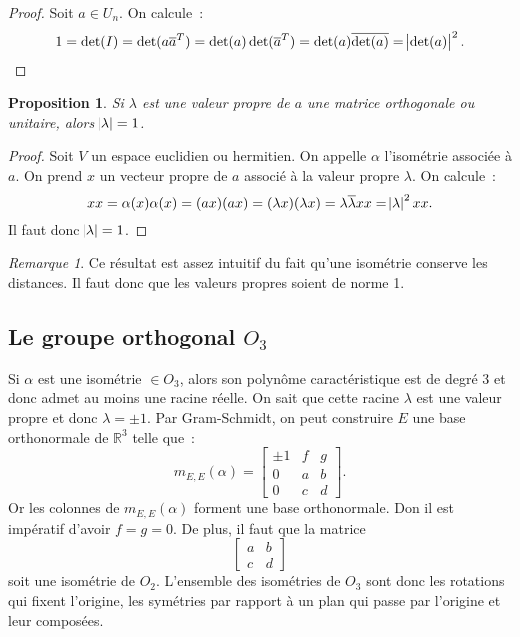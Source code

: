 \documentclass{article}
\newcommand{\R}{\mathbb R}
\newcommand{\conj}[1]{\overline {#1}}
\newtheorem{prp}[thm]{Proposition}
\theoremstyle{definition}
\theoremstyle{remark}
\newtheorem*{rmq}{Remarque}
\begin{document}
		\begin{proof} Soit $a \in U_n$. On calcule~:
		\[1 = \det(I) = \det(a\conj a^T) = \det(a)\det(\conj a^T) = \det(a)\conj{\det(a)} = \abs {\det(a)}^2.\]
		\end{proof}

		\begin{prp} Si $\lambda$ est une valeur propre de $a$ une matrice orthogonale ou unitaire, alors $\abs \lambda = 1$.
		\end{prp}

		\begin{proof} Soit $V$ un espace euclidien ou hermitien. On appelle $\alpha$ l'isométrie associée à $a$. On prend $x$ un vecteur propre de $a$ associé
		à la valeur propre $\lambda$. On calcule~:
		\[xx = \alpha(x)\alpha(x) = (ax)(ax) = (\lambda x)(\lambda x) = \lambda\conj{\lambda}xx = \abs \lambda^2xx.\]
		Il faut donc $\abs \lambda = 1$.
		\end{proof}

		\begin{rmq} Ce résultat est assez intuitif du fait qu'une isométrie conserve les distances. Il faut donc que les valeurs propres soient de norme 1.
		\end{rmq}

	\subsection{Le groupe orthogonal $O_3$}
		Si $\alpha$ est une isométrie $\in O_3$, alors son polynôme caractéristique est de degré 3 et donc admet au moins une racine réelle. On
		sait que cette racine $\lambda$ est une valeur propre et donc $\lambda = \pm 1$. Par Gram-Schmidt, on peut construire $E$ une base orthonormale de
		$\R^3$ telle que~:
		\[m_{E, E}(\alpha) =
		\begin{bmatrix}
			\pm 1 & f & g \\
			  0   & a & b \\
			  0   & c & d
		\end{bmatrix}.\]
		Or les colonnes de $m_{E, E}(\alpha)$ forment une base orthonormale. Don il est impératif d'avoir $f = g = 0$. De plus, il faut que la matrice
		\[\begin{bmatrix}a & b \\ c & d\end{bmatrix}\]
		soit une isométrie de $O_2$. L'ensemble des isométries de $O_3$ sont donc les rotations qui fixent l'origine, les symétries par rapport à un plan
		qui passe par l'origine et leur composées.
\end{document}
